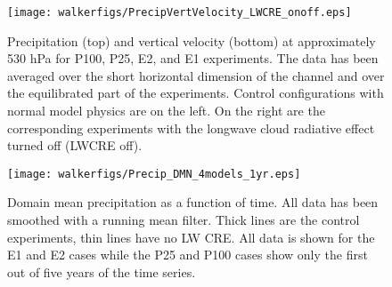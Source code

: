 \documentclass[11pt]{article}   	%
\begin{document}


\begin{figure}
  \centering
      \texttt{[image: walkerfigs/PrecipVertVelocity\_LWCRE\_onoff.eps]}
  \caption{Precipitation (top) and vertical velocity (bottom) at approximately 530 hPa for P100, P25, E2, and E1 experiments.  
  The data has been averaged over the short horizontal dimension of the channel and over the 
  equilibrated part of the experiments.  Control configurations with normal model physics are on the 
  left.  On the right are the corresponding experiments with the longwave cloud radiative effect turned
  off (LWCRE off).}
  \label{fig:precip_vertvel}
\end{figure}
%
%
%

\begin{figure}
  \centering
      \texttt{[image: walkerfigs/Precip\_DMN\_4models\_1yr.eps]}
  \caption{Domain mean precipitation as a function of time.  All data has been smoothed with a running mean filter.  
  Thick lines are the control experiments, thin lines have no LW CRE.  All data is shown for the E1 and E2 cases
  while the P25 and P100 cases show only the first out of five years of the time series.}
    \label{fig:precip_dom_mn}
\end{figure}
\end{document}
